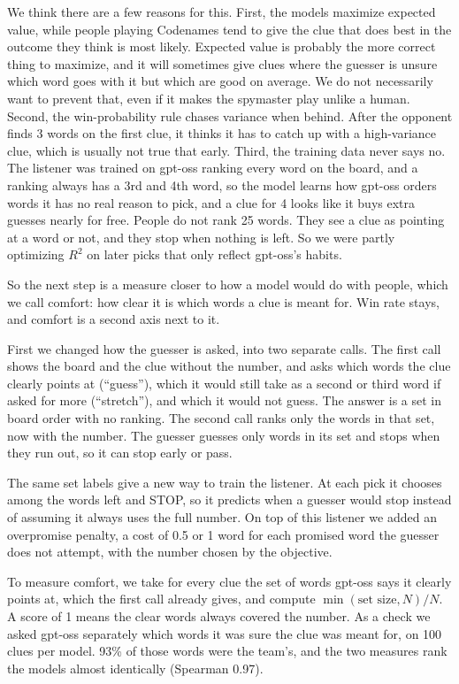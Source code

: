 \documentclass[11pt]{article}
\begin{document}
We think there are a few reasons for this. First, the models maximize expected
value, while people playing Codenames tend to give the clue that does best in the
outcome they think is most likely. Expected value is probably the more correct
thing to maximize, and it will sometimes give clues where the guesser is unsure
which word goes with it but which are good on average. We do not necessarily want
to prevent that, even if it makes the spymaster play unlike a human. Second, the
win-probability rule chases variance when behind. After the opponent finds 3 words
on the first clue, it thinks it has to catch up with a high-variance clue, which is
usually not true that early. Third, the training data never says no. The listener
was trained on gpt-oss ranking every word on the board, and a ranking always has a
3rd and 4th word, so the model learns how gpt-oss orders words it has no real
reason to pick, and a clue for 4 looks like it buys extra guesses nearly for free.
People do not rank 25 words. They see a clue as pointing at a word or not, and they
stop when nothing is left. So we were partly optimizing $R^2$ on later picks that
only reflect gpt-oss's habits.

So the next step is a measure closer to how a model would do with people, which we
call comfort: how clear it is which words a clue is meant for. Win rate stays, and
comfort is a second axis next to it.

First we changed how the guesser is asked, into two separate calls. The first call
shows the board and the clue without the number, and asks which words the clue
clearly points at (``guess''), which it would still take as a second or third word
if asked for more (``stretch''), and which it would not guess. The answer is a set
in board order with no ranking. The second call ranks only the words in that set,
now with the number. The guesser guesses only words in its set and stops when they
run out, so it can stop early or pass.

The same set labels give a new way to train the listener. At each pick it chooses
among the words left and STOP, so it predicts when a guesser would stop instead of
assuming it always uses the full number. On top of this listener we added an
overpromise penalty, a cost of 0.5 or 1 word for each promised word the guesser
does not attempt, with the number chosen by the objective.

To measure comfort, we take for every clue the set of words gpt-oss says it clearly
points at, which the first call already gives, and compute $\min(\text{set size},
N)/N$. A score of 1 means the clear words always covered the number. As a check we
asked gpt-oss separately which words it was sure the clue was meant for, on 100
clues per model. 93\% of those words were the team's, and the two measures rank the
models almost identically (Spearman 0.97).
\end{document}
